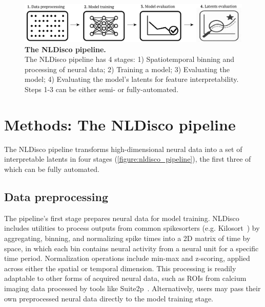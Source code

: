 \begin{figure}[h]
    \centering
    \includegraphics[width=\linewidth]{figures/nldisco_pipeline.pdf}
    \caption{
        \textbf{The NLDisco pipeline.} \\
        \small The NLDisco pipeline has 4 stages: 1) Spatiotemporal binning and processing of neural data; 2) Training a model; 3) Evaluating the model; 4) Evaluating the model's latents for feature interpretability. Steps 1-3 can be either semi- or fully-automated.
        \vspace{-1em}
    }
    \label{figure:nldisco_pipeline}
\end{figure}

\section{Methods: The NLDisco pipeline}

The NLDisco pipeline transforms high-dimensional neural data into a set of interpretable latents in four stages (\autoref{figure:nldisco_pipeline}), the first three of which can be fully automated.

\subsection{Data preprocessing}

The pipeline's first stage prepares neural data for model training. NLDisco includes utilities to process outputs from common spikesorters (e.g. Kilosort~\cite{pachitariu_2016_kilosort}) by aggregating, binning, and normalizing spike times into a 2D matrix of time by space, in which each bin contains neural activity from a neural unit for a specific time period. Normalization operations include min-max and z-scoring, applied across either the spatial or temporal dimension. This processing is readily adaptable to other forms of acquired neural data, such as ROIs from calcium imaging data processed by tools like Suite2p~\cite{pachitariu_2017_suite2p}. Alternatively, users may pass their own preprocessed neural data directly to the model training stage.

